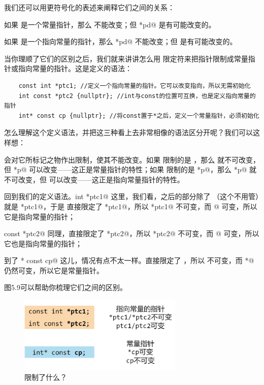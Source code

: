 我们还可以用更符号化的表述来阐释它们之间的关系：\par
如果 \lstinline@pd@ 是一个常量指针，那么 \lstinline@pd@ 不能改变；但 \lstinline@*pd@ 是有可能改变的。\par
如果 \lstinline@pd@ 是一个指向常量的指针，那么 \lstinline@*pd@ 不能改变；但 \lstinline@pd@ 是有可能改变的。\par
当你理顺了它们的区别之后，我们就来讲讲怎么用 \lstinline@const@ 限定符来把指针限制成常量指针或指向常量的指针。这是定义的语法：
\begin{lstlisting}
    const int *ptc1; //定义一个指向常量的指针。它可以改变指向，所以无需初始化
    int const *ptc2 {nullptr}; //int与const的位置可互换，也是定义指向常量的指针
    int* const cp {nullptr}; //将const置于*之后，定义一个常量指针，必须初始化
\end{lstlisting}
怎么理解这个定义语法，并把这三种看上去非常相像的语法区分开呢？我们可以这样想：\par
\lstinline@const@ 会对它所标记之物作出限制，使其不能改变。如果 \lstinline@const@ 限制的是 \lstinline@p@，那么 \lstinline@p@ 就不可改变，但 \lstinline@*p@ 可以改变——这正是常量指针的特性；如果 \lstinline@const@ 限制的是 \lstinline@*p@，那么 \lstinline@*p@ 就不可改变，但 \lstinline@p@ 可以改变——这正是指向常量指针的特性。\par
回到我们的定义语法。\lstinline@const int *ptc1@ 这里，我们看，\lstinline@const@ 之后的部分除了 \lstinline@int@（这个不用管）就是 \lstinline@*ptc1@，于是 \lstinline@const@ 直接限定了 \lstinline@*ptc1@，所以 \lstinline@*ptc1@ 不可变，而 @ 可变，所以它是指向常量的指针；\par
\lstinline@int const *ptc2@ 同理，\lstinline@const@ 直接限定了 \lstinline@*ptc2@，所以 \lstinline@*ptc2@ 不可变，而 @ 可变，所以它也是指向常量的指针；\par
到了 \lstinline@int* const cp@ 这儿，情况有点不太一样。\lstinline@const@ 直接限定了 \lstinline@cp@，所以 \lstinline@cp@ 不可变，而 \lstinline@cp*@ 仍然可变，所以它是常量指针。\par
图5.9可以帮助你梳理它们之间的区别。\par
\begin{figure}[htbp]
    \centering
    \includegraphics[width=0.7\textwidth]{../images/generalized_parts/05_definition_of_constant_pointer_and_pointer_to_const.png}
    \caption{\lstinline@const@ 限制了什么？}
\end{figure}
